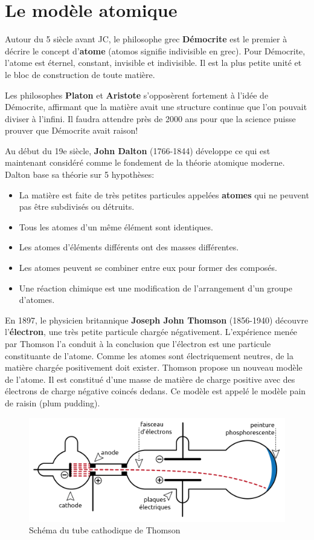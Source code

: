 \documentclass[
  11pt,
  a4paper,
  openany]{book}
\providecommand{\tightlist}{%
  \setlength{\itemsep}{0pt}\setlength{\parskip}{0pt}}
\begin{document}
\section{Le modèle atomique}\label{le-moduxe8le-atomique}

Autour du 5 siècle avant JC, le philosophe grec \textbf{Démocrite} est le premier à décrire le concept d'\textbf{atome} (atomos signifie indivisible en grec). Pour Démocrite, l'atome est éternel, constant, invisible et indivisible. Il est la plus petite unité et le bloc de construction de toute matière.

Les philosophes \textbf{Platon} et \textbf{Aristote} s'opposèrent fortement à l'idée de Démocrite, affirmant que la matière avait une structure continue que l'on pouvait diviser à l'infini. Il faudra attendre près de 2000 ans pour que la science puisse prouver que Démocrite avait raison!

Au début du 19e siècle, \textbf{John Dalton} (1766-1844) développe ce qui est maintenant considéré comme le fondement de la théorie atomique moderne. Dalton base sa théorie sur 5 hypothèses:

\begin{itemize}
\tightlist
\item
  La matière est faite de très petites particules appelées \textbf{atomes} qui ne peuvent pas être subdivisés ou détruits.
\item
  Tous les atomes d'un même élément sont identiques.
\item
  Les atomes d'éléments différents ont des masses différentes.
\item
  Les atomes peuvent se combiner entre eux pour former des composés.
\item
  Une réaction chimique est une modification de l'arrangement d'un groupe d'atomes.
\end{itemize}

En 1897, le physicien britannique \textbf{Joseph John Thomson} (1856-1940) découvre l'\textbf{électron}, une très petite particule chargée négativement. L'expérience menée par Thomson l'a conduit à la conclusion que l'électron est une particule constituante de l'atome. Comme les atomes sont électriquement neutres, de la matière chargée positivement doit exister. Thomson propose un nouveau modèle de l'atome. Il est constitué d'une masse de matière de charge positive avec des électrons de charge négative coincés dedans. Ce modèle est appelé le modèle pain de raisin (plum pudding).

\begin{figure}

{\centering \includegraphics[width=0.4\linewidth]{images/exp-thomson} 

}

\caption{Schéma du tube cathodique de Thomson}\label{fig:exp-thomson}
\end{figure}
\end{document}
